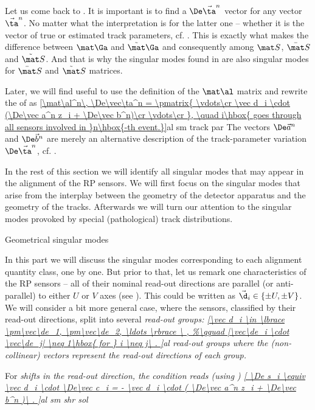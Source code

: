 Let us come back to . It is important is to find a $\De\vec\ta^n$ vector for any vector $\vec\ta^n$. No matter what the interpretation is for the latter one -- whether it is the vector of true or estimated track parameters, cf. . This is exactly what makes the difference between $\mat\Ga$ and $\tilde\mat\Ga$ and consequently among $\mat S$, $\bar\mat S$ and $\tilde\mat S$. And that is why the singular modes found in  are also singular modes for $\bar\mat S$ and $\tilde\mat S$ matrices.

Later, we will find useful to use the definition of the $\mat\al$ matrix  and rewrite the \rhs{} of  as
\eqref{\mat\al^n\, \De\vec\ta^n = \pmatrix{
	\vdots\cr
	\vec d_i \cdot (\De\vec a^n z_i + \De\vec b^n)\cr
	\vdots\cr
}, \quad i\hbox{ goes through all sensors involved in }n\hbox{-th event.}}{al sm track par}
The vectors $\De\vec a^n$ and $\De\vec b^n$ are merely an alternative description of the track-parameter variation $\De\vec\ta^n$, cf. .

In the rest of this section we will identify all singular modes that may appear in the alignment of the RP sensors. We will first focus on the singular modes that arise from the interplay between the geometry of the detector apparatus and the geometry of the tracks. Afterwards we will turn our attention to the singular modes provoked by special (pathological) track distributions.

\caption{Geometrical singular modes}

In this part we will discuss the singular modes corresponding to each alignment quantity class, one by one. But prior to that, let us remark one characteristics of the RP sensors -- all of their nominal read-out directions are parallel (or anti-parallel) to either $U$ or $V$ axes (see ). This could be written as $\vec\d_i \in \{\pm U, \pm V\}$. We will consider a bit more general case, where the sensors, classified by their read-out directions, split into several \em{read-out groups}:
\eqref{\vec d_i \in \lbrace \pm\vec\de_1, \pm\vec\de_2, \ldots \rbrace \ ,
}{al read-out groups}
where the (non-collinear) vectors represent the read-out directions of each group. 

For \em{shifts in the read-out direction}, the condition  reads (using )
\eqref{
	\De s_i \equiv
	\vec d_i \cdot \De\vec c_i =
	- \vec d_i \cdot ( \De\vec a^n z_i + \De\vec b^n )\ .
}{al sm shr sol}

